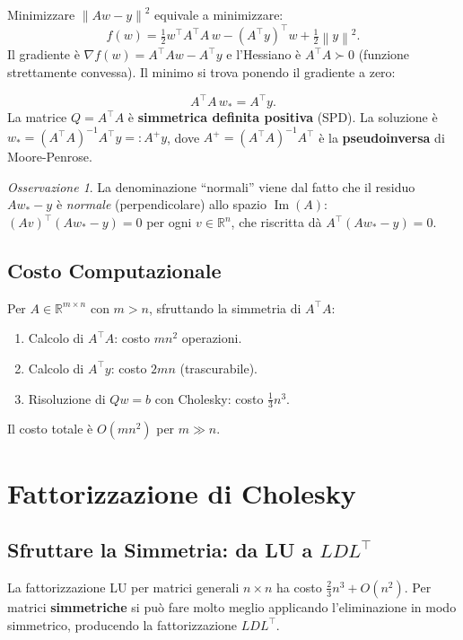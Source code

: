 \documentclass[11pt,a4paper]{article}
\theoremstyle{definition}
\theoremstyle{plain}
\theoremstyle{remark}
\newtheorem{remark}{Osservazione}[section]
\newcommand{\R}{\mathbb{R}}
\newcommand{\norm}[1]{\left\| #1 \right\|}
\newcommand{\T}{^{\top}}
\newcommand{\grad}{\nabla}
\begin{document}
Minimizzare $\norm{Aw-y}^2$ equivale a minimizzare:
\[
  f(w) = \tfrac{1}{2}w\T A\T A\, w - (A\T y)\T w + \tfrac{1}{2}\norm{y}^2.
\]
Il gradiente è $\grad f(w) = A\T A w - A\T y$ e l'Hessiano è $A\T A \succ 0$ (funzione
strettamente convessa). Il minimo si trova ponendo il gradiente a zero:

\begin{keybox}
  \[
    A\T A\, w_* = A\T y.
  \]
  La matrice $Q = A\T A$ è \textbf{simmetrica definita positiva} (SPD).
  La soluzione è $w_* = (A\T A)^{-1} A\T y =: A^+ y$,
  dove $A^+ = (A\T A)^{-1} A\T$ è la \textbf{pseudoinversa} di Moore-Penrose.
\end{keybox}

\begin{remark}
  La denominazione ``normali'' viene dal fatto che il residuo $Aw_* - y$ è \emph{normale}
  (perpendicolare) allo spazio $\operatorname{Im}(A)$:
  $(Av)\T(Aw_* - y) = 0$ per ogni $v \in \R^n$, che riscritta dà $A\T(Aw_* - y) = 0$.
\end{remark}

\subsection{Costo Computazionale}

Per $A \in \R^{m \times n}$ con $m > n$, sfruttando la simmetria di $A\T A$:
\begin{enumerate}
  \item Calcolo di $A\T A$: costo $mn^2$ operazioni.
  \item Calcolo di $A\T y$: costo $2mn$ (trascurabile).
  \item Risoluzione di $Qw = b$ con Cholesky: costo $\frac{1}{3}n^3$.
\end{enumerate}
Il costo totale è $O(mn^2)$ per $m \gg n$.

\section{Fattorizzazione di Cholesky}
\label{sec:chol}

\subsection{Sfruttare la Simmetria: da LU a $LDL\T$}

La fattorizzazione LU per matrici generali $n \times n$ ha costo $\frac{2}{3}n^3 + O(n^2)$.
Per matrici \textbf{simmetriche} si può fare molto meglio applicando l'eliminazione in modo simmetrico,
producendo la fattorizzazione $LDL\T$.
\end{document}
